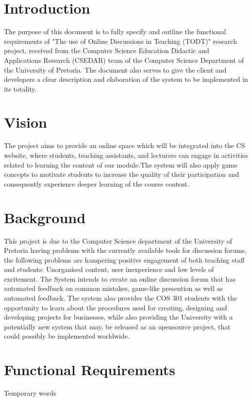 \documentclass[11pt]{article}
\begin{document}


\tableofcontents
\newpage


\section{Introduction}

The purpose of this document is to fully specify and outline the functional requirements of "The use of Online Discussions in Teaching (TODT)" research project, received from the Computer Science Education Didactic and Applications Research (CSEDAR) team of the Computer Science Department of the University of Pretoria. The document also serves to give the client and developers a clear description and elaboration of the system to be implemented in its totality.

\section{Vision}

The project aims to provide an online space which will be integrated into the CS website, where students, teaching assistants, and lecturers can engage in activities
related to learning the content of our module.The system will also apply game concepts to motivate students to increase the quality of their participation and consequently experience deeper learning of the course content.

\section{Background}
This project is due to the Computer Science department of the University of Pretoria having problems with the currently available tools for discussion forums, the following
problems are hampering positive engagement of both teaching staff and students: Unorganised content, user inexperience and  low levels of excitement.
\newline
The System intends to create an online discussion forum that has automated feedback on common mistakes, game-like presention as well as automated feedback. The system also provides the COS 301 students with the opportunity to learn about the procedures used for creating, designing and developing projects for businesses, while also providing the University with a potentially new system that may, be released as an opensource project, that could possibly be implemented worldwide.
\newpage
\section{Functional Requirements}
Temporary words
\end{document}
